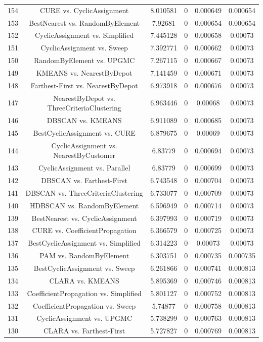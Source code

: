 \documentclass[a4paper,10pt]{article}
\begin{document}
\begin{landscape}
\begin{table}[!htp]
\begin{tabular}{cccccc}
154&CURE vs. CyclicAssignment&8.010581&0&0.000649&0.000654\\
153&BestNearest vs. RandomByElement&7.92681&0&0.000654&0.000654\\
152&CyclicAssignment vs. Simplified&7.445128&0&0.000658&0.00073\\
151&CyclicAssignment vs. Sweep&7.392771&0&0.000662&0.00073\\
150&RandomByElement vs. UPGMC&7.267115&0&0.000667&0.00073\\
149&KMEANS vs. NearestByDepot&7.141459&0&0.000671&0.00073\\
148&Farthest-First vs. NearestByDepot&6.973918&0&0.000676&0.00073\\
147&NearestByDepot vs. ThreeCriteriaClustering&6.963446&0&0.00068&0.00073\\
146&DBSCAN vs. KMEANS&6.911089&0&0.000685&0.00073\\
145&BestCyclicAssignment vs. CURE&6.879675&0&0.00069&0.00073\\
144&CyclicAssignment vs. NearestByCustomer&6.83779&0&0.000694&0.00073\\
143&CyclicAssignment vs. Parallel&6.83779&0&0.000699&0.00073\\
142&DBSCAN vs. Farthest-First&6.743548&0&0.000704&0.00073\\
141&DBSCAN vs. ThreeCriteriaClustering&6.733077&0&0.000709&0.00073\\
140&HDBSCAN vs. RandomByElement&6.596949&0&0.000714&0.00073\\
139&BestNearest vs. CyclicAssignment&6.397993&0&0.000719&0.00073\\
138&CURE vs. CoefficientPropagation&6.366579&0&0.000725&0.00073\\
137&BestCyclicAssignment vs. Simplified&6.314223&0&0.00073&0.00073\\
136&PAM vs. RandomByElement&6.303751&0&0.000735&0.000735\\
135&BestCyclicAssignment vs. Sweep&6.261866&0&0.000741&0.000813\\
134&CLARA vs. KMEANS&5.895369&0&0.000746&0.000813\\
133&CoefficientPropagation vs. Simplified&5.801127&0&0.000752&0.000813\\
132&CoefficientPropagation vs. Sweep&5.74877&0&0.000758&0.000813\\
131&CyclicAssignment vs. UPGMC&5.738299&0&0.000763&0.000813\\
130&CLARA vs. Farthest-First&5.727827&0&0.000769&0.000813\\

\end{tabular}
\end{table}
\end{landscape}
\end{document}
